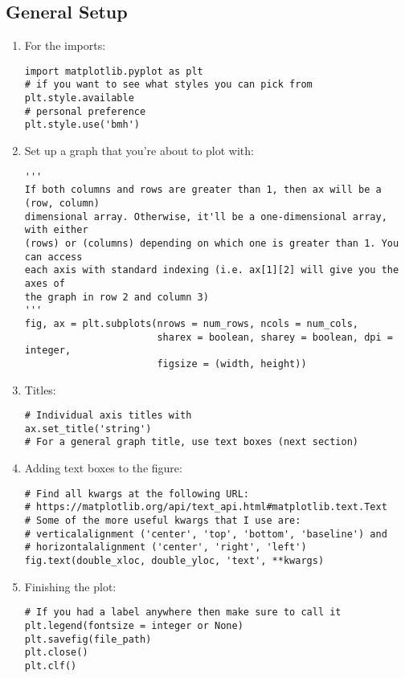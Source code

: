 \documentclass{article}
\begin{document}
\subsection{General Setup}
\begin{enumerate}
    \item For the imports:
    \begin{verbatim}
import matplotlib.pyplot as plt
# if you want to see what styles you can pick from
plt.style.available
# personal preference
plt.style.use('bmh')
    \end{verbatim}
    \item Set up a graph that you're about to plot with:
    \begin{verbatim}
'''
If both columns and rows are greater than 1, then ax will be a (row, column)
dimensional array. Otherwise, it'll be a one-dimensional array, with either
(rows) or (columns) depending on which one is greater than 1. You can access
each axis with standard indexing (i.e. ax[1][2] will give you the axes of
the graph in row 2 and column 3)
''' 
fig, ax = plt.subplots(nrows = num_rows, ncols = num_cols,
                       sharex = boolean, sharey = boolean, dpi = integer,
                       figsize = (width, height))
    \end{verbatim}
    \item Titles:
    \begin{verbatim}
# Individual axis titles with
ax.set_title('string')
# For a general graph title, use text boxes (next section)
    \end{verbatim}
    \item Adding text boxes to the figure:
    \begin{verbatim}
# Find all kwargs at the following URL:
# https://matplotlib.org/api/text_api.html#matplotlib.text.Text
# Some of the more useful kwargs that I use are:
# verticalalignment ('center', 'top', 'bottom', 'baseline') and
# horizontalalignment ('center', 'right', 'left')
fig.text(double_xloc, double_yloc, 'text', **kwargs)
    \end{verbatim}
    \item Finishing the plot:
    \begin{verbatim}
# If you had a label anywhere then make sure to call it
plt.legend(fontsize = integer or None)
plt.savefig(file_path)
plt.close()
plt.clf()
    \end{verbatim}
\end{enumerate}
\end{document}
